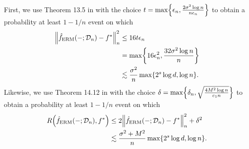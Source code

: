 \documentclass[11pt]{article}
\DeclarePairedDelimiter{\braces}{\lbrace}{\rbrace}
\DeclarePairedDelimiter{\paren}{(}{)}
\DeclarePairedDelimiter{\norm}{\|}{\|}
\newcommand{\sparsity}{s}
\newcommand{\nfeats}{d}
\newcommand{\nsamples}{n}
\newcommand{\data}[1][n]{\mathcal{D}_{#1}}
\newcommand{\ferm}{\hat{f}_{\operatorname{ERM}}}
\begin{document}
First, we use Theorem 13.5 in \cite{wainwright2019high} with the choice $t = \max\braces*{\epsilon_n,\frac{2\sigma^2\log\nsamples}{\nsamples\epsilon_n}}$ to obtain a probability at least $1-1/n$ event on which
\begin{equation}
\begin{split}
    \norm*{\ferm(-;\data) - f^*}_n^2 & \leq 16t\epsilon_n \\
    & = \max\braces*{16\epsilon_n^2,\frac{32\sigma^2\log\nsamples}{\nsamples}} \\
    & \lesssim \frac{\sigma^2}{\nsamples}\max\braces*{2^\sparsity\log\nfeats,\log\nsamples}.
\end{split}
\end{equation}
Likewise, we use Theorem 14.12 in \cite{wainwright2019high} with the choice $\delta = \max\braces*{\delta_n, \sqrt{\frac{4M^2\log n}{c_1 n}}}$ to obtain a probability at least $1-1/n$ event on which
\begin{equation} \label{eq:erm_upper_helper}
    \begin{split}
        R\paren*{\ferm(-;\data), f^*} & \leq 2\norm*{\ferm(-;\data) - f^*}_n^2 + \delta^2 \\
        & \lesssim \frac{\sigma^2 + M^2}{\nsamples}\max\braces*{2^\sparsity\log\nfeats,\log\nsamples}.
    \end{split}
\end{equation}
\end{document}
